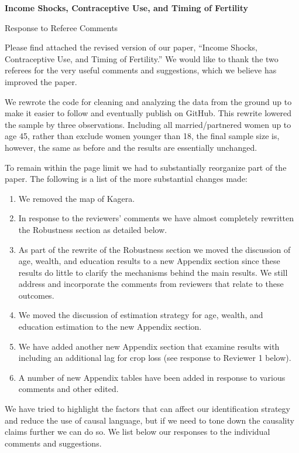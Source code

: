 \documentclass[letterpaper,12pt]{article}
\title{} \author{}
\begin{document}
\begin{center} \textbf{\large Income Shocks, Contraceptive Use, and
Timing of Fertility} \end{center}

\begin{center} Response to Referee Comments \end{center}

\noindent Please find attached the revised version of our paper,
``Income Shocks, Contraceptive Use, and Timing of Fertility.''
We would like to thank the two referees for the very useful comments and
suggestions,
which we believe has improved the paper.

We rewrote the code for cleaning and analyzing the data from the ground up 
to make it easier to follow and eventually publish on GitHub.
This rewrite lowered the sample by three observations.
Including all married/partnered women up to age 45, rather than exclude
women younger than 18, the final sample size is, however, the same as 
before and the results are essentially unchanged.

To remain within the page limit we had to substantially reorganize
part of the paper.
The following is a list of the more substantial changes made:
\begin{enumerate}
\item We removed the map of Kagera.
\item In response to the reviewers' comments we have almost completely
rewritten the Robustness section as detailed below.
\item As part of the rewrite of the Robustness section we moved 
the discussion of age, wealth, and education results to a new Appendix
section since these results do little to clarify the mechanisms 
behind the main results.
We still address and incorporate the comments from reviewers that
relate to these outcomes.
\item We moved the discussion of estimation strategy for age,
wealth, and education estimation to the new Appendix section.
\item We have added another new Appendix section that examine results 
with including an additional lag for crop loss (see response to
Reviewer 1 below).
\item A number of new Appendix tables have been added in response
to various comments and other edited.
\end{enumerate}

We have tried to highlight the factors that can affect our identification 
strategy and reduce the use of causal language, but if we need to tone down 
the causality claims further we can do so.
We list below our responses to the individual comments and suggestions.
\end{document}
